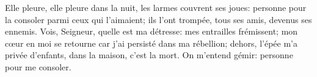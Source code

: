 Elle pleure, elle pleure dans la nuit, les larmes couvrent ses joues:
	personne pour la consoler parmi ceux qui l’aimaient;
	ils l’ont trompée, tous ses amis, devenus ses ennemis.
Vois, Seigneur, quelle est ma détresse: mes entrailles frémissent;
	mon cœur en moi se retourne car j’ai persisté dans ma rébellion;
	dehors, l’épée m’a privée d’enfants, dans la maison, c’est la mort.
On m’entend gémir: personne pour me consoler.
